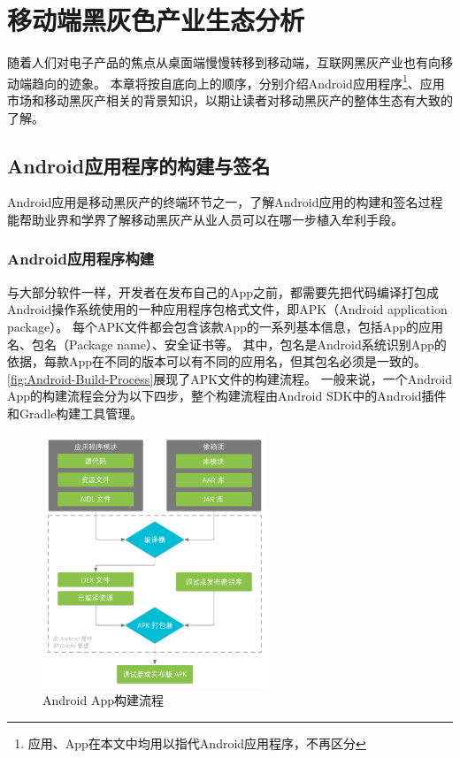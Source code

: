 \chapter{移动端黑灰色产业生态分析}
\label{chp:background}

随着人们对电子产品的焦点从桌面端慢慢转移到移动端，互联网黑灰产业也有向移动端趋向的迹象。
本章将按自底向上的顺序，分别介绍Android应用程序\footnote{应用、App在本文中均用以指代Android应用程序，不再区分}、应用市场和移动黑灰产相关的背景知识，以期让读者对移动黑灰产的整体生态有大致的了解。

\section{Android应用程序的构建与签名}
\label{sec:signature}

Android应用是移动黑灰产的终端环节之一，了解Android应用的构建和签名过程能帮助业界和学界了解移动黑灰产从业人员可以在哪一步植入牟利手段。

\subsection{Android应用程序构建}

与大部分软件一样，开发者在发布自己的App之前，都需要先把代码编译打包成Android操作系统使用的一种应用程序包格式文件，即APK（Android application package）。
每个APK文件都会包含该款App的一系列基本信息，包括App的应用名、包名（Package name）、安全证书等。
其中，包名是Android系统识别App的依据，每款App在不同的版本可以有不同的应用名，但其包名必须是一致的。
\autoref{fig:Android-Build-Process}展现了APK文件的构建流程。
一般来说，一个Android App的构建流程会分为以下四步，整个构建流程由Android SDK中的Android插件和Gradle构建工具管理。

\begin{figure}[htbp]
	\centering
	\includegraphics[width=0.6\textwidth]{./Figures/edwin-build-process-CHN.png}
	\caption{Android App构建流程}
	\label{fig:Android-Build-Process}
\end{figure}

